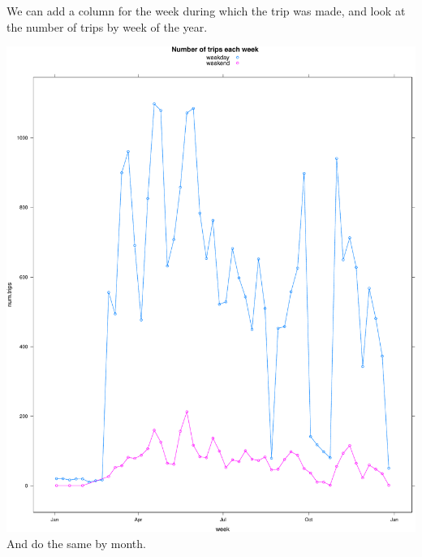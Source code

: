 \documentclass[]{article}
\begin{document}
We can add a column for the week during which the trip was made, and
look at the number of trips by week of the year.

\includegraphics{velopassBirdsEye_files/figure-latex/tripsbyweek-1.pdf}
And do the same by month.
\end{document}
